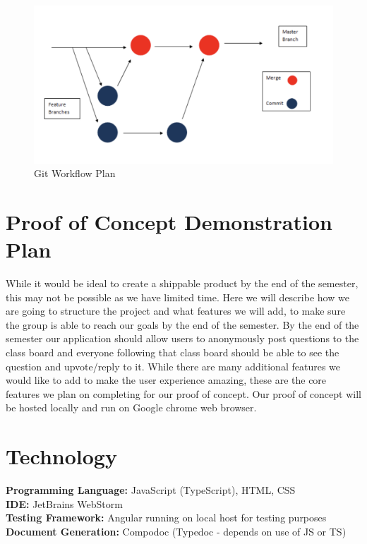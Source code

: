 \documentclass{article}
\begin{document}
\begin{figure}[h!]
  \centering 
  \includegraphics[scale=.69]{img/plan.png}
  \caption{Git Workflow Plan}
  \label{plan}
\end{figure}

\section{Proof of Concept Demonstration Plan}
While it would be ideal to create a shippable product by the end of the semester, this may not be possible as we have limited time. Here we will describe how we are going to structure the project and what features we will add, to make sure the group is able to reach our goals by the end of the semester. By the end of the semester our application should allow users to anonymously post questions to the class board and everyone following that class board should be able to see the question and upvote/reply to it. While there are many additional features we would like to add to make the user experience amazing, these are the core features we plan on completing for our proof of concept. Our proof of concept will be hosted locally and run on Google chrome web browser.


\section{Technology}

\textbf{Programming Language:} JavaScript (TypeScript), HTML, CSS \\ 
\textbf{IDE:} JetBrains WebStorm\\
\textbf{Testing Framework:} Angular running on local host for testing purposes \\
\textbf{Document Generation:} Compodoc (Typedoc - depends on use of JS or TS) \\ 
\end{document}
